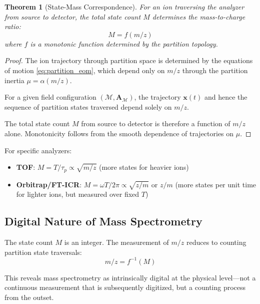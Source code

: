 \documentclass[twocolumn,10pt,a4paper]{article}
\newtheorem{theorem}{Theorem}[section]
\theoremstyle{definition}
\theoremstyle{remark}
\newcommand{\Mdepth}{\mathcal{M}}
\newcommand{\Apartition}{\mathbf{A}_{\mathcal{M}}}
\newcommand{\partinert}{\mu}
\newcommand{\taup}{\tau_p}
\begin{document}
\begin{theorem}[State-Mass Correspondence]
\label{thm:state_mass}
For an ion traversing the analyzer from source to detector, the total state count $M$ determines the mass-to-charge ratio:
\begin{equation}
    M = f(m/z)
    \label{eq:state_mass}
\end{equation}
where $f$ is a monotonic function determined by the partition topology.
\end{theorem}

\begin{proof}
The ion trajectory through partition space is determined by the equations of motion \eqref{eq:partition_eom}, which depend only on $m/z$ through the partition inertia $\partinert = \alpha(m/z)$.

For a given field configuration $(\Mdepth, \Apartition)$, the trajectory $\mathbf{x}(t)$ and hence the sequence of partition states traversed depend solely on $m/z$.

The total state count $M$ from source to detector is therefore a function of $m/z$ alone. Monotonicity follows from the smooth dependence of trajectories on $\partinert$.
\end{proof}

For specific analyzers:
\begin{itemize}
    \item \textbf{TOF}: $M = T/\taup \propto \sqrt{m/z}$ (more states for heavier ions)
    \item \textbf{Orbitrap/FT-ICR}: $M = \omega T/2\pi \propto \sqrt{z/m}$ or $z/m$ (more states per unit time for lighter ions, but measured over fixed $T$)
\end{itemize}

\subsection{Digital Nature of Mass Spectrometry}

The state count $M$ is an integer. The measurement of $m/z$ reduces to counting partition state traversals:
\begin{equation}
    m/z = f^{-1}(M)
    \label{eq:mz_from_count}
\end{equation}

This reveals mass spectrometry as intrinsically digital at the physical level---not a continuous measurement that is subsequently digitized, but a counting process from the outset.
\end{document}
